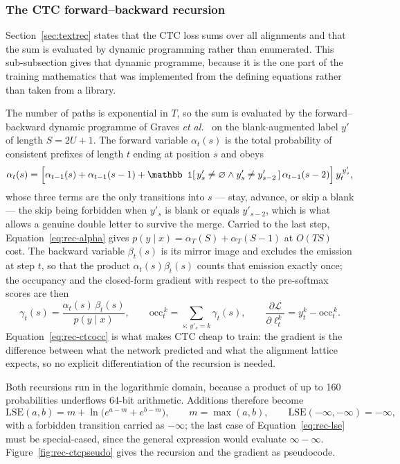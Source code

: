 \subsubsection{The CTC forward--backward recursion}

Section~\ref{sec:textrec} states that the CTC loss sums over all alignments and that the sum is evaluated by dynamic programming rather than enumerated.
This sub-subsection gives that dynamic programme, because it is the one part of the training mathematics that was implemented from the defining equations rather than taken from a library.

The number of paths is exponential in $T$, so the sum is evaluated by the forward--backward dynamic programme of Graves \emph{et al.}~\cite{graves2006} on the blank-augmented label $y'$ of length $S=2U+1$.
The forward variable $\alpha_t(s)$ is the total probability of consistent prefixes of length $t$ ending at position $s$ and obeys
\begin{equation}
\alpha_t(s)=\Bigl[\alpha_{t-1}(s)+\alpha_{t-1}(s-1)+\mathbb 1[\,y'_s\ne\varnothing\wedge y'_s\ne y'_{s-2}\,]\,\alpha_{t-1}(s-2)\Bigr]\,y_t^{\,y'_s},\label{eq:rec-alpha}
\end{equation}
whose three terms are the only transitions into $s$ --- stay, advance, or skip a blank --- the skip being forbidden when $y'_s$ is blank or equals $y'_{s-2}$, which is what allows a genuine double letter to survive the merge.
Carried to the last step, Equation~\ref{eq:rec-alpha} gives $p(y\mid x)=\alpha_T(S)+\alpha_T(S-1)$ at $O(TS)$ cost.
The backward variable $\beta_t(s)$ is its mirror image and excludes the emission at step $t$, so that the product $\alpha_t(s)\beta_t(s)$ counts that emission exactly once; the occupancy and the closed-form gradient with respect to the pre-softmax scores are then
\begin{equation}
\gamma_t(s)=\frac{\alpha_t(s)\,\beta_t(s)}{p(y\mid x)},\qquad \mathrm{occ}_t^{\,k}=\sum_{s:\,y'_s=k}\gamma_t(s),\qquad \frac{\partial\mathcal L}{\partial\ell_t^{k}}=y_t^k-\mathrm{occ}_t^{\,k}.\label{eq:rec-ctcocc}
\end{equation}
Equation~\ref{eq:rec-ctcocc} is what makes CTC cheap to train: the gradient is the difference between what the network predicted and what the alignment lattice expects, so no explicit differentiation of the recursion is needed.

Both recursions run in the logarithmic domain, because a product of up to 160 probabilities underflows 64-bit arithmetic.
Additions therefore become
\begin{equation}
\mathrm{LSE}(a,b)=m+\ln\bigl(e^{a-m}+e^{b-m}\bigr),\qquad m=\max(a,b),\qquad \mathrm{LSE}(-\infty,-\infty)=-\infty,\label{eq:rec-lse}
\end{equation}
with a forbidden transition carried as $-\infty$; the last case of Equation~\ref{eq:rec-lse} must be special-cased, since the general expression would evaluate $\infty-\infty$.
Figure~\ref{fig:rec-ctcpseudo} gives the recursion and the gradient as pseudocode.

